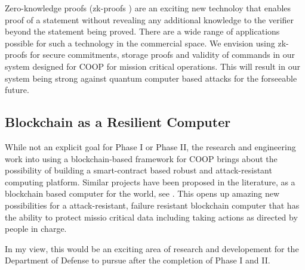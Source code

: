 Zero-knowledge proofs (zk-proofs \cite{bunz2018}) are an exciting new technoloy that enables proof of a statement without revealing any additional
knowledge to the verifier beyond the statement being proved. There are a wide range of applications possible for such
a technology in the commercial space. We envision using zk-proofs for secure commitments, storage proofs and validity of
commands in our system designed for COOP for mission critical operations. This will result in our system being strong
against quantum computer based attacks for the forseeable future.

\subsection{Blockchain as a Resilient Computer}

While not an explicit goal for Phase I or Phase II, the research and engineering work into using a blockchain-based
framework for COOP brings about the possibility of building a smart-contract based robust and attack-resistant computing
platform. Similar projects have been proposed in the literature, as a blockchain based computer for the world, see 
\cite{reyes2018, yahya2019, hanke2018}. This opens up amazing new possibilities for a attack-resistant, failure
resistant blockchain computer that has the ability to protect missio critical data including taking actions as directed
by people in charge.

In my view, this would be an exciting area of research and developement for the Department of Defense to pursue after the completion
of Phase I and II.


